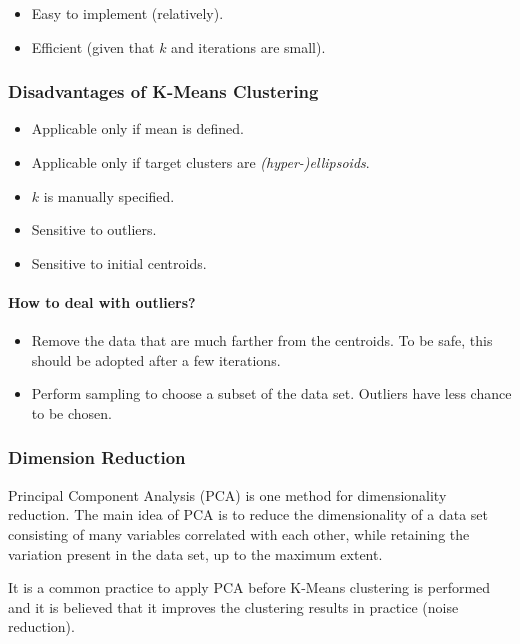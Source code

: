 \documentclass{note}
\begin{document}
\begin{itemize}
    \item Easy to implement (relatively).
    \item Efficient (given that $k$ and iterations are small).
\end{itemize}

\subsubsection{Disadvantages of K-Means Clustering}

\begin{itemize}
    \item Applicable only if mean is defined.
    \item Applicable only if target clusters are \textit{(hyper-)ellipsoids}.
    \item $k$ is manually specified.
    \item Sensitive to outliers.
    \item Sensitive to initial centroids.
\end{itemize}

\paragraph{How to deal with outliers?}
\begin{itemize}
    \item Remove the data that are much farther from the centroids. To be safe, this should be adopted after a few iterations.
    \item Perform sampling to choose a subset of the data set. Outliers have less chance to be chosen.
\end{itemize}

\subsubsection{Dimension Reduction}

Principal Component Analysis (PCA) is one method for dimensionality reduction. The main idea of PCA is to reduce the dimensionality of a data set consisting of many variables correlated with each other, while retaining the variation present in the data set, up to the maximum extent.

It is a common practice to apply PCA before K-Means clustering is performed and it is believed that it improves the clustering results in practice (noise reduction).
\end{document}
